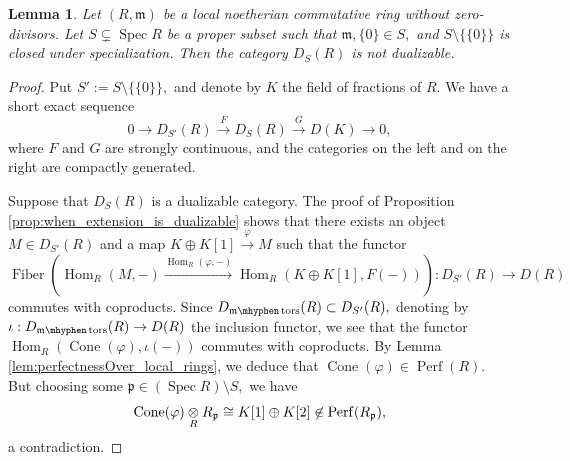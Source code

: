 \documentclass[11pt,leqno]{amsart}
\newtheorem{lemma}[theo]{Lemma}
\numberwithin{equation}{section}
\def\Hom{\operatorname{Hom}}
\newcommand{\tens}[1]{%
  \mathbin{\mathop{\otimes}\displaylimits_{#1}}%
}
\newcommand{\hy}{\mhyphen}
\newcommand{\xto}{\xrightarrow}
\newcommand{\Cone}{\operatorname{Cone}}
\newcommand{\Fiber}{\operatorname{Fiber}}
\newcommand{\Perf}{\operatorname{Perf}}
\newcommand{\Spec}{\operatorname{Spec}}
\newcommand{\tors}{\operatorname{tors}}
\newcommand{\mfp}{\mathfrak{p}}
\newcommand{\m}{\mathfrak{m}}
\begin{document}
\begin{lemma}\label{lem:nonconvex_special} Let $(R,\m)$ be a local noetherian commutative ring without zero-divisors. Let $S\subsetneq\Spec R$ be a proper subset such that $\m,\{0\}\in S,$ and $S\setminus\{\{0\}\}$ is closed under specialization. Then the category $D_S(R)$ is not dualizable.\end{lemma}

\begin{proof}Put $S':=S\setminus\{\{0\}\},$ and denote by $K$ the field of fractions of $R.$ We have a short exact sequence
$$0\to D_{S'}(R)\xto{F} D_S(R)\xto{G} D(K)\to 0,$$
where $F$ and $G$ are strongly continuous, and the categories on the left and on the right are compactly generated.

Suppose that $D_S(R)$ is a dualizable category. The proof of Proposition \ref{prop:when_extension_is_dualizable} shows that there exists an object $M\in D_{S'}(R)$ and a map $K\oplus K[1]\xto{\varphi} M$ such that the functor
$$\Fiber(\Hom_R(M,-)\xto{\Hom_R(\varphi,-)} \Hom_R(K\oplus K[1],F(-))):D_{S'}(R)\to D(R)$$ commutes with coproducts. Since $D_{\m\hy\tors}(R)\subset D_{S'}(R),$ denoting by $\iota:D_{\m\hy\tors}(R)\to D(R)$ the inclusion functor, we see that the functor
$\Hom_R(\Cone(\varphi),\iota(-))$ commutes with coproducts. By Lemma \ref{lem:perfectnessOver_local_rings}, we deduce that $\Cone(\varphi)\in\Perf(R).$ But choosing some $\mfp\in(\Spec R)\setminus S,$ we have
$$\Cone(\varphi)\tens{R}R_{\mfp}\cong K[1]\oplus K[2]\not\in\Perf(R_{\mfp}),$$
a contradiction.\end{proof}
\end{document}
